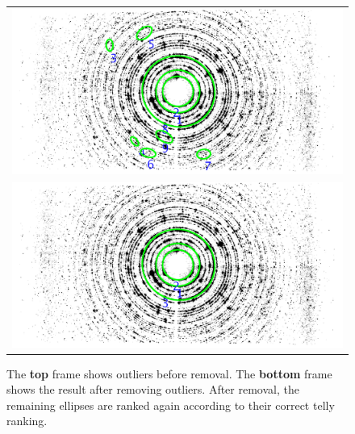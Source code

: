 \documentclass[preprint]{iucr}              %
\begin{document}
\begin{figure}
\begin{tabular}{c}
\includegraphics[width=.80\linewidth]{Outliers/o_LaB6_0021__Ranked_FullSize_9.png}
\\
\includegraphics[width=.80\linewidth]{Outliers/o_Lab6_0021__Ranked_FullSize_3.png}
\end{tabular}

\label{fig:result_outliers}
\caption {The \textbf{top} frame shows outliers before removal. The \textbf{bottom} frame shows the result after removing outliers. After removal, the remaining ellipses are ranked again according to their correct telly ranking.}
\end{figure}
\end{document}
